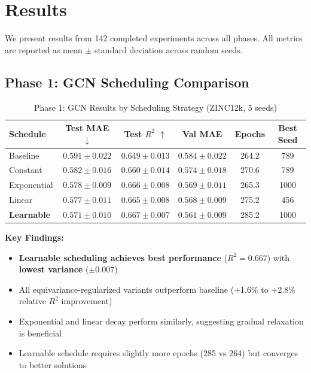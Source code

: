 \documentclass[11pt,a4paper]{article}
\begin{document}
\section{Results}

We present results from 142 completed experiments across all phases. All metrics are reported as mean $\pm$ standard deviation across random seeds.

\subsection{Phase 1: GCN Scheduling Comparison}

\begin{table}[H]
\centering
\caption{Phase 1: GCN Results by Scheduling Strategy (ZINC12k, 5 seeds)}
\label{tab:phase1}
\begin{tabular}{lccccc}
\toprule
\textbf{Schedule} & \textbf{Test MAE} $\downarrow$ & \textbf{Test $R^2$} $\uparrow$ & \textbf{Val MAE} & \textbf{Epochs} & \textbf{Best Seed} \\
\midrule
Baseline & $0.591 \pm 0.022$ & $0.649 \pm 0.013$ & $0.584 \pm 0.022$ & 264.2 & 789 \\
Constant & $0.582 \pm 0.016$ & $0.660 \pm 0.014$ & $0.574 \pm 0.018$ & 270.6 & 789 \\
Exponential & $0.578 \pm 0.009$ & $0.666 \pm 0.008$ & $0.569 \pm 0.011$ & 265.3 & 1000 \\
Linear & $0.577 \pm 0.011$ & $0.665 \pm 0.008$ & $0.568 \pm 0.009$ & 275.2 & 456 \\
\textbf{Learnable} & $\mathbf{0.571 \pm 0.010}$ & $\mathbf{0.667 \pm 0.007}$ & $\mathbf{0.561 \pm 0.009}$ & 285.2 & 1000 \\
\bottomrule
\end{tabular}
\end{table}

\textbf{Key Findings:}
\begin{itemize}
    \item \textbf{Learnable scheduling achieves best performance} ($R^2 = 0.667$) with \textbf{lowest variance} ($\pm 0.007$)
    \item All equivariance-regularized variants outperform baseline (+1.6\% to +2.8\% relative $R^2$ improvement)
    \item Exponential and linear decay perform similarly, suggesting gradual relaxation is beneficial
    \item Learnable schedule requires slightly more epochs (285 vs 264) but converges to better solutions
\end{itemize}
\end{document}

